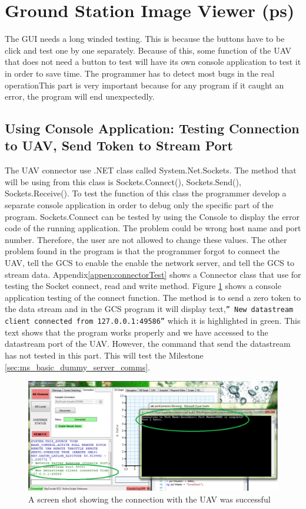 \section{Ground Station Image Viewer (ps)}
\label{sec:ground_station_image_viewer}
The GUI needs a long winded testing. This is because the buttons have to be click and test one by one separately. Because of this, some function of the UAV that does not need a button to test will have its own console application to test it in order to save time. The programmer has to detect most bugs in the real operationThis part is very important because for any program if it caught an error, the program will end unexpectedly.
\subsection{Using Console Application: Testing Connection to UAV, Send Token to Stream Port}
\label{sec:testing_connection_send_to_stream}
The UAV connector use .NET class called System.Net.Sockets. The method that will be using from this class is Sockets.Connect(), Sockets.Send(), Sockets.Receive(). To test the function of this class the programmer develop a separate console application in order to debug only the specific part of the program. Sockets.Connect can be tested by using the Console to display the error code of the running application. The problem could be wrong host name and port number. Therefore, the user are not allowed to change these values. The other problem found in the program is that the programmer forgot to connect the UAV, tell the GCS to enable the enable the network server, and tell the GCS to stream data. Appendix\ref{appen:connectorTest} shows a Connector class that use for testing the Socket connect, read and write method.
Figure \ref{connect to Stream Port} shows a console application testing of the connect function. 
The method is to send a zero token to the data stream and in the GCS program it will display text,\texttt{''\* New datastream client connected from 127.0.0.1:49586''} which it is highlighted in green. 
This text shows that the program works properly and we have accessed to the datastream port of the UAV.
However, the command that send the datastream has not tested in this part. 
This will test the Milestone \ref{sec:ms_basic_dummy_server_comms}.
\begin{figure}[H]
\begin{center}
\includegraphics[width=1.00\textwidth]{testing_screenshots/test_sending.png} 
\end{center}
\caption{A screen shot showing the connection with the UAV was successful\label{connect to Stream Port}}
\end{figure}

